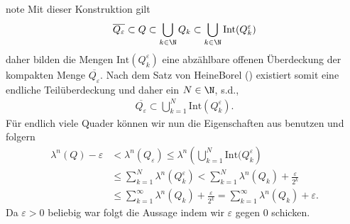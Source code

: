 \documentclass[letterpaper,10pt,german]{jupyterBook}
\begin{document}
\begin{sphinxadmonition}{note}
\sphinxAtStartPar
Mit dieser Konstruktion gilt
\begin{equation*}
\begin{split}\overline{Q_\varepsilon} \subset Q\subset \bigcup_{k\in\N} Q_k \subset 
\bigcup_{k\in\N}\text{Int}(Q_k^\varepsilon)\end{split}
\end{equation*}
\sphinxAtStartPar
daher bilden die Mengen \(\text{Int}(Q_k^\varepsilon)\) eine abzählbare offenen Überdeckung der kompakten Menge \(\overline{Q_\varepsilon}\).
Nach dem Satz von Heine\sphinxhyphen{}Borel ({\hyperref[\detokenize{masstheorie/masstheorie:thm:heineborel}]{}}) existiert somit eine endliche Teilüberdeckung und daher ein \(N\in\N\), s.d.,
\begin{equation*}
\begin{split}\overline{Q_\varepsilon}\subset \bigcup_{k=1}^N\text{Int}(Q_k^\varepsilon).\end{split}
\end{equation*}
\sphinxAtStartPar
Für endlich viele Quader können wir nun die Eigenschaften aus {\hyperref[\detokenize{masstheorie/masstheorie:thm:lebesguevolume}]{}} benutzen und folgern
\begin{equation*}
\begin{split}\lambda^n(Q) -\varepsilon &< \lambda^n(Q_\varepsilon) \leq 
\lambda^n\left(\bigcup_{k=1}^N\text{Int}(Q_k^\varepsilon\right) 
\\&\leq 
\sum_{k=1}^N \lambda^n(Q_k^\varepsilon) < 
\sum_{k=1}^N \lambda^n(Q_k) + \frac{\varepsilon}{2^k} 
\\&\leq
\sum_{k=1}^\infty \lambda^n(Q_k) + \frac{\varepsilon}{2^k} = \sum_{k=1}^\infty \lambda^n(Q_k) +\varepsilon.\end{split}
\end{equation*}
\sphinxAtStartPar
Da \(\varepsilon>0\) beliebig war folgt die Aussage indem wir \(\varepsilon\) gegen \(0\) schicken.


\end{sphinxadmonition}
\end{document}
